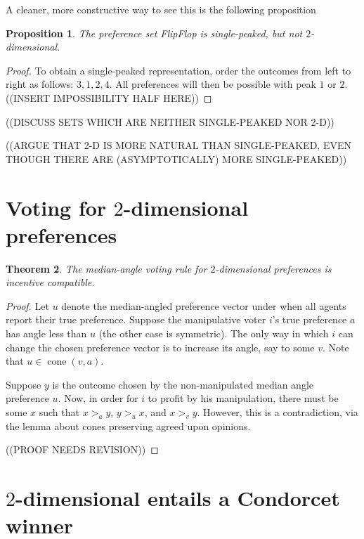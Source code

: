 \documentclass[12pt]{article}
\newtheorem{theorem}{Theorem}
\newtheorem{proposition}[theorem]{Proposition}
\DeclareMathOperator*{\cone}{cone}
\newcommand{\1}[1]{\mathds{1}[{#1}]}
\begin{document}
  A cleaner, more constructive way to see this is the following proposition
  \begin{proposition}
    The preference set {\sc FlipFlop} is single-peaked, but not
    $2$-dimensional.
  \end{proposition}
  \begin{proof}
    To obtain a single-peaked representation, order the outcomes
    from left to right as follows: $3,1,2,4$.
    All preferences will then be possible with peak $1$ or $2$.
    ((INSERT IMPOSSIBILITY HALF HERE))
  \end{proof}

  ((DISCUSS SETS WHICH ARE NEITHER SINGLE-PEAKED NOR 2-D))

  ((ARGUE THAT 2-D IS MORE NATURAL THAN SINGLE-PEAKED,
  EVEN THOUGH THERE ARE (ASYMPTOTICALLY) MORE SINGLE-PEAKED))
\section{Voting for $2$-dimensional preferences}

  \begin{theorem}
    The median-angle voting rule for $2$-dimensional preferences
    is incentive compatible.
  \end{theorem}
  \begin{proof}
    Let $u$ denote the median-angled preference vector under when all
    agents report their true preference.
    Suppose the manipulative voter $i$'s true preference $a$
    has angle less than $u$ (the other case is symmetric).
    The only way in which $i$ can change the chosen preference vector
    is to increase its angle, say to some $v$.
    Note that $u \in \cone(v,a)$.

    Suppose $y$ is the outcome chosen by the non-manipulated median
    angle preference $u$.
    Now, in order for $i$ to profit by his manipulation,
    there must be some $x$ such that
    $x >_a y$, $y >_u x$, and $x >_v y$.
    However, this is a contradiction, via the lemma about cones
    preserving agreed upon opinions.

    ((PROOF NEEDS REVISION))
  \end{proof}

\section{$2$-dimensional entails a Condorcet winner}
\end{document}
